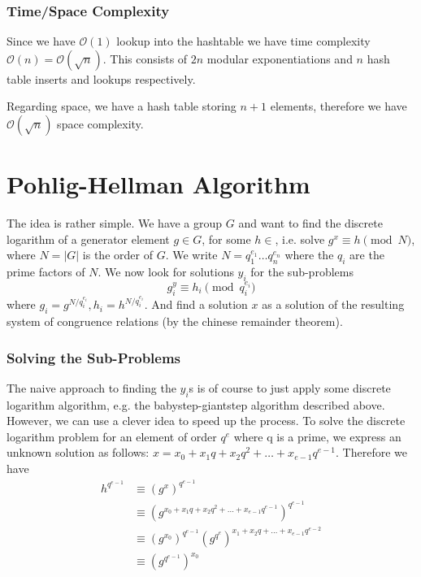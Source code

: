 \subsubsection{Time/Space Complexity}
Since we have $\mathcal{O}(1)$ lookup into the hashtable we have time complexity $\mathcal{O}(n) = \mathcal{O}(\sqrt{n})$. This consists of $2n$ modular exponentiations and $n$ hash table inserts and lookups respectively.

Regarding space, we have a hash table storing $n + 1$ elements, therefore we have $\mathcal{O}(\sqrt{n})$ space complexity.

\section{Pohlig-Hellman Algorithm}

The idea is rather simple. We have a group $G$ and want to find the discrete logarithm of a generator element $g \in G$, for some $h \in $, i.e. solve $g^x \equiv h \pmod{N}$, where $N = |G|$ is the order of $G$. We write $N = q_1^{e_1}\dots q_n^{e_n}$ where the $q_i$ are the prime factors of $N$. We now look for solutions $y_i$ for the sub-problems
\[ g_i^{y} \equiv h_i \pmod{q_i^{e_i}} \]
where $g_i = g^{N/{q_i^{e_i}}}, h_i = h^{N/q_i^{e_i}}$.
And find a solution $x$ as a solution of the resulting system of congruence relations (by the chinese remainder theorem).

\subsubsection{Solving the Sub-Problems}

The naive approach to finding the $y_i$s is of course to just apply some discrete logarithm algorithm, e.g. the babystep-giantstep algorithm described above. However, we can use a clever idea to speed up the process. To solve the discrete logarithm problem for an element of order $q^e$ where q is a prime, we express an unknown solution as follows: $x = x_0 + x_1q + x_2q^2 + \dots + x_{e-1}q^{e-1}$. Therefore we have
\begin{align*}
h^{q^{e-1}} &\equiv (g^x)^{q^{e-1}} \\
  &\equiv (g^{x_0 + x_1q + x_2q^2 + \dots + x_{e-1}q^{e-1}})^{q^{e-1}} \\
  &\equiv (g^{x_0})^{q^{e-1}}(g^{q^e})^{x_1 + x_2q + \dots + x_{e-1}q^{e-2}} \\
  &\equiv (g^{q^{e-1}})^{x_0}
\end{align*}

